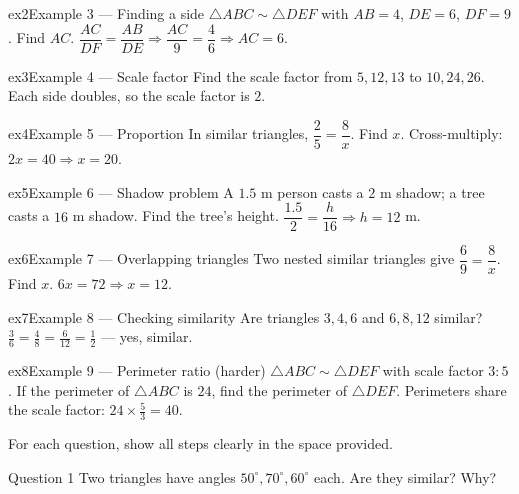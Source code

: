 \documentclass[11pt]{article}
\begin{document}
\begin{example}{ex2}{Example 3 --- Finding a side}
$\triangle ABC\sim\triangle DEF$ with $AB=4$, $DE=6$, $DF=9$. Find $AC$.
\soln $\dfrac{AC}{DF}=\dfrac{AB}{DE}\Rightarrow \dfrac{AC}{9}=\dfrac{4}{6}\Rightarrow AC=6.$
\end{example}

\begin{example}{ex3}{Example 4 --- Scale factor}
Find the scale factor from $5,12,13$ to $10,24,26$.
\soln Each side doubles, so the scale factor is $2$.
\end{example}

\begin{example}{ex4}{Example 5 --- Proportion}
In similar triangles, $\dfrac{2}{5}=\dfrac{8}{x}$. Find $x$.
\soln Cross-multiply: $2x=40\Rightarrow x=20.$
\end{example}

\begin{example}{ex5}{Example 6 --- Shadow problem}
A $1.5$ m person casts a $2$ m shadow; a tree casts a $16$ m shadow. Find the tree's height.
\soln $\dfrac{1.5}{2}=\dfrac{h}{16}\Rightarrow h=12$ m.
\end{example}

\begin{example}{ex6}{Example 7 --- Overlapping triangles}
Two nested similar triangles give $\dfrac{6}{9}=\dfrac{8}{x}$. Find $x$.
\soln $6x=72\Rightarrow x=12.$
\end{example}

\begin{example}{ex7}{Example 8 --- Checking similarity}
Are triangles $3,4,6$ and $6,8,12$ similar?
\soln $\tfrac36=\tfrac48=\tfrac{6}{12}=\tfrac12$ --- yes, similar.
\end{example}

\begin{example}{ex8}{Example 9 --- Perimeter ratio (harder)}
$\triangle ABC\sim\triangle DEF$ with scale factor $3:5$. If the perimeter of $\triangle ABC$ is $24$, find the perimeter of $\triangle DEF$.
\soln Perimeters share the scale factor: $24\times\tfrac53=40.$
\end{example}

\clearpage
{}
For each question, show all steps clearly in the space provided.

\begin{qbox}{Question 1}
Two triangles have angles $50^\circ,70^\circ,60^\circ$ each. Are they similar? Why?\workspace{2.0cm}
\end{qbox}
\end{document}
